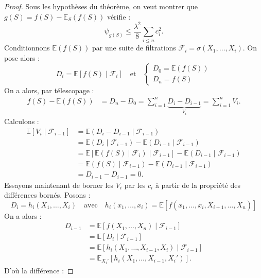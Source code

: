 \begin{proof}
    Sous les hypothèses du théorème, on veut montrer que $ g(S) = f(S) - \mathbb{E}_S(f(S))$ vérifie : 
    $$ 
        \psi_{g(S)} \leqslant \frac{ \lambda^2}{8} \sum_{ i \leqslant n} c_i^2. 
    $$
    Conditionnons $ \mathbb{E}(f(S))$ par une suite de filtrations $ \mathcal{F}_i = \sigma (X_1, \dots, X_i)$. On pose alors : 
    $$ 
        D_i = \mathbb{E}[ f(S) \mid \mathcal{F}_i] \quad \text{et} \quad 
        \begin{cases}
            D_0 = \mathbb{E}(f(S)) \\ 
            D_n = f(S)
        \end{cases}
    $$
    On a alors, par télescopage : 
    \begin{align*}
        f(S) - \mathbb{E}(f(S)) &= D_n - D_0 
        = \sum_{i=1}^{n} \underbrace{D_i - D_{i-1}}_{V_i} = \sum_{i=1}^{n} V_i. 
    \end{align*}
    Calculons : 
    \begin{align*}
        \mathbb{E}[V_i \mid \mathcal{F}_{i-1}] &= \mathbb{E}(D_i - D_{i-1} \mid \mathcal{F}_{i-1}) \\ 
        &= \mathbb{E}(D_i \mid \mathcal{F}_{i-1}) - \mathbb{E}(D_{i-1} \mid \mathcal{F}_{i-1}) \\ 
        &= \mathbb{E}\left[ \mathbb{E}(f(S) \mid \mathcal{F}_{i}) \mid \mathcal{F}_{i-1}\right] - \mathbb{E}(D_{i-1} \mid \mathcal{F}_{i-1}) \\ 
        &= \mathbb{E}(f(S) \mid \mathcal{F}_{i-1}) - \mathbb{E}(D_{i-1} \mid \mathcal{F}_{i-1}) \\ 
        &= D_{i-1} - D_{i-1} = 0. 
    \end{align*}
    Essayons maintenant de borner les $V_i$ par les $c_i$ à partir de la propriété des différences bornés. Posons : 
    $$ 
        D_i = h_i(X_1, \dots, X_i) \quad \text{avec} \quad h_i(x_1, \dots, x_i) = \mathbb{E}[f(x_1, \dots, x_i, X_{i+1}, \dots, X_n)]
    $$
    On a alors : 
    \begin{align*}
        D_{i-1} &= \mathbb{E}\left[ f(X_1, \dots, X_n) \mid \mathcal{F}_{i-1}\right] \\ 
        &= \mathbb{E} \left[D_i \mid \mathcal{F}_{i-1}\right] \\ 
        &= \mathbb{E}\left[ h_i(X_1, \dots, X_{i-1}, X_i) \mid \mathcal{F}_{i-1}\right] \\ 
        &= \mathbb{E}_{X_i'}\left[ h_i(X_1, \dots, X_{i-1}, X_i') \right]. 
    \end{align*}
    D'où la différence : 

\end{proof}
